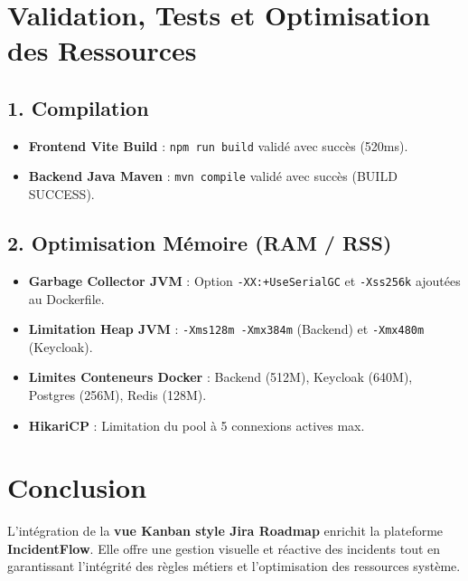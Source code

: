 \documentclass[11pt,a4paper]{article}
\begin{document}
\section{Validation, Tests et Optimisation des Ressources}





\subsection{1. Compilation}
\begin{itemize}
    \item \textbf{Frontend Vite Build} : \texttt{npm run build} validé avec succès (520ms).
    \item \textbf{Backend Java Maven} : \texttt{mvn compile} validé avec succès (BUILD SUCCESS).
\end{itemize}

\subsection{2. Optimisation Mémoire (RAM / RSS)}
\begin{itemize}
    \item \textbf{Garbage Collector JVM} : Option \texttt{-XX:+UseSerialGC} et \texttt{-Xss256k} ajoutées au Dockerfile.
    \item \textbf{Limitation Heap JVM} : \texttt{-Xms128m -Xmx384m} (Backend) et \texttt{-Xmx480m} (Keycloak).
    \item \textbf{Limites Conteneurs Docker} : Backend (512M), Keycloak (640M), Postgres (256M), Redis (128M).
    \item \textbf{HikariCP} : Limitation du pool à 5 connexions actives max.
\end{itemize}

\section{Conclusion}

L'intégration de la \textbf{vue Kanban style Jira Roadmap} enrichit la plateforme \textbf{IncidentFlow}. Elle offre une gestion visuelle et réactive des incidents tout en garantissant l'intégrité des règles métiers et l'optimisation des ressources système.
\end{document}
